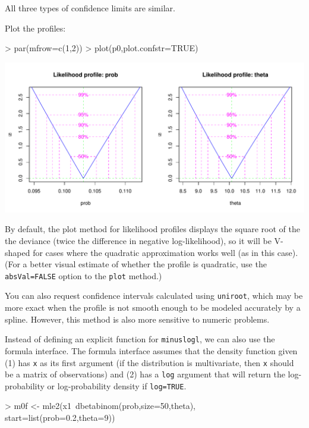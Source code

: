 \documentclass{article}
\newcommand{\code}[1]{{\tt #1}}
\begin{document}
All three types of confidence limits are similar.

Plot the profiles:
\begin{Schunk}
\begin{Sinput}
> par(mfrow=c(1,2))
> plot(p0,plot.confstr=TRUE)
\end{Sinput}
\end{Schunk}
\includegraphics{mle2-profplot1}

By default, the plot method for 
likelihood profiles displays the square root of the
the deviance
(twice the difference in negative
log-likelihood), so it will
be {\sf V}-shaped
for cases where the quadratic approximation works well
(as in this case).
(For a better visual estimate of whether the profile
is quadratic, use the \code{absVal=FALSE} option to the \code{plot}
method.)

You can also request confidence intervals
calculated using \code{uniroot}, which may be more exact when
the profile is not smooth enough to be modeled accurately
by a spline.  However, this method is
also more sensitive to numeric problems.

Instead of defining an
explicit function for \code{minuslogl}, 
we can also use the formula interface.
The formula interface assumes that
the density function given (1) has \code{x} as
its first argument (if the distribution is multivariate,
then \code{x} should be a matrix of observations)
and (2) has a \code{log} argument that will return
the log-probability or log-probability density
if \code{log=TRUE}.
\begin{Schunk}
\begin{Sinput}
> m0f <- mle2(x1~dbetabinom(prob,size=50,theta),
             start=list(prob=0.2,theta=9))
\end{Sinput}
\end{Schunk}
\end{document}

